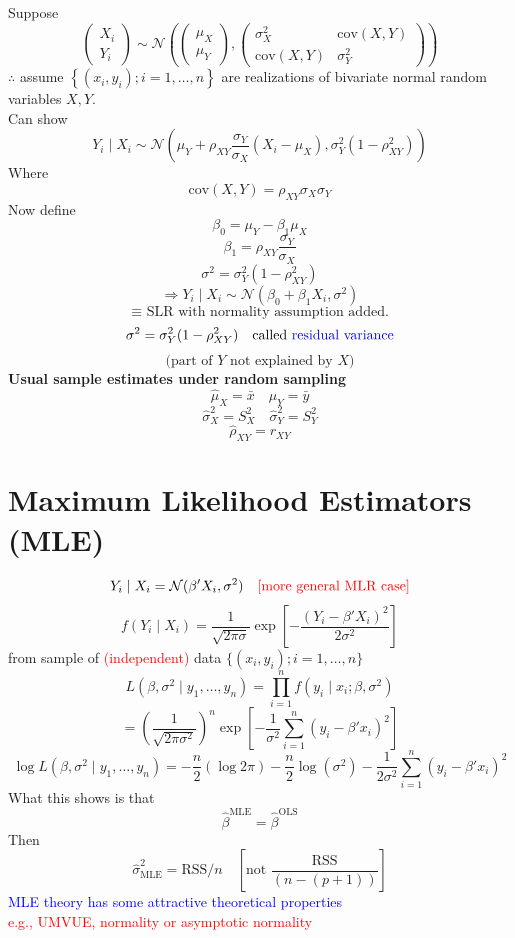 \documentclass[14pt]{extarticle}
\begin{document}
\noindent
Suppose
\[
\begin{pmatrix}
X_i \\
Y_i
\end{pmatrix}
\sim \mathcal{N} \left(
\begin{pmatrix}
\mu_X \\
\mu_Y
\end{pmatrix},
\begin{pmatrix}
\sigma_X^2 & \text{cov}(X, Y) \\
\text{cov}(X, Y) & \sigma_Y^2
\end{pmatrix}
\right)
\]
$\therefore$ assume \textcolor{blue}{} $\left\{ (x_i, y_i); i = 1, \dots, n \right\}$ are realizations of bivariate normal random variables $X, Y$.\\
Can show
\[
Y_i \mid X_i \sim \mathcal{N} \left( \mu_Y + \rho_{XY} \frac{\sigma_Y}{\sigma_X} (X_i - \mu_X), \sigma_Y^2 (1 - \rho_{XY}^2) \right)
\]
Where
\[
\text{cov}(X, Y) = \rho_{XY} \sigma_X \sigma_Y
\]
Now define
\[
\beta_0 = \mu_Y - \beta_1 \mu_X
\]
\[
\beta_1 = \rho_{XY} \frac{\sigma_Y}{\sigma_X}
\]
\[
\sigma^2 = \sigma_Y^2 (1 - \rho_{XY}^2)
\]
\[
\Rightarrow Y_i \mid X_i \sim \mathcal{N}(\beta_0 + \beta_1 X_i, \sigma^2)
\]
\[
\equiv \text{ SLR with normality assumption added.}
\]
\[
\sigma^2 = \sigma_Y^2 (1 - \rho_{XY}^2) \quad \text{called \textcolor{blue}{residual variance}}
\]
\[
\text{(part of } Y \text{ not explained by } X \text{)}
\]
\textbf{Usual sample estimates under random sampling}
\[
\hat{\mu}_X = \bar{x} \quad \hat{\mu}_Y = \bar{y}
\]
\[
\hat{\sigma}_X^2 = S_X^2 \quad \hat{\sigma}_Y^2 = S_Y^2
\]
\[
\hat{\rho}_{XY} = r_{XY}
\]

\section*{Maximum Likelihood Estimators (MLE)}

\[
Y_i \mid X_i = \mathcal{N}(\beta' X_i, \sigma^2) \quad \text{\textcolor{red}{[more general MLR case]}}
\]
\[
f(Y_i \mid X_i) = \frac{1}{\sqrt{2 \pi \sigma}} \exp \left[ -\frac{(Y_i - \beta' X_i)^2}{2 \sigma^2} \right]
\]
\noindent
from sample of \textcolor{red}{(independent)} data $\{(x_i, y_i); i = 1, \dots, n\}$
\[
L(\beta, \sigma^2 \mid y_1, \dots, y_n) = \prod_{i=1}^{n} f(y_i \mid x_i; \beta, \sigma^2)
\]
\[
= \left( \frac{1}{\sqrt{2 \pi \sigma^2}} \right)^n \exp \left[ -\frac{1}{\sigma^2} \sum_{i=1}^{n} (y_i - \beta' x_i)^2 \right]
\]
\[
\log L(\beta, \sigma^2 \mid y_1, \dots, y_n) = -\frac{n}{2} (\log 2 \pi) - \frac{n}{2} \log(\sigma^2) - \frac{1}{2 \sigma^2} \sum_{i=1}^{n} (y_i - \beta' x_i)^2
\]
What this shows is that
\[
\hat{\beta}^{\text{MLE}} = \hat{\beta}^{\text{OLS}}
\]
Then
\[
\hat{\sigma}_{\text{MLE}}^2 = \text{RSS} / n \quad \left[ \text{not } \frac{\text{RSS}}{(n - (p + 1))} \right]
\]
\textcolor{blue}{MLE theory has some attractive theoretical properties}\\
\textcolor{red}{e.g., UMVUE, normality or asymptotic normality}
\end{document}
